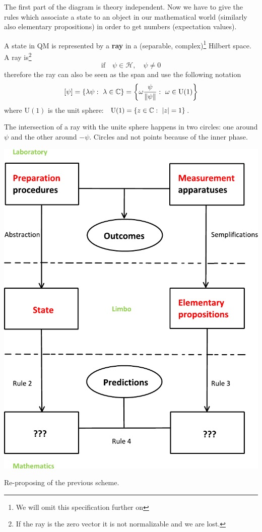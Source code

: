 \documentclass[../main.tex]{subfiles}
\begin{document}
The first part of the diagram  is theory independent. Now we have to give the rules which associate a state to an object in our mathematical world (similarly also elementary propositions) in order to get numbers (expectation values).
\begin{definition}
A state in QM is represented by a \textbf{ray} in a (separable, complex)\footnote{We will omit this specification further on} Hilbert space. A ray is\footnote{If the ray is the zero vector it is not normalizable and we are lost.}
\[
\textrm{if} \quad \psi \in \mathcal{H}, \quad \psi \neq 0
\]
therefore the ray can also be seen as the span and use the following notation
\[
\qty[\psi] = \left\{\lambda \psi : \ \lambda\in\mathbb{C}\right \} = \left\{\omega \frac{\psi}{\norm{\psi}} : \ \omega \in \textrm{U}(1)\right \}
\]
where $\textrm{U}(1)$ is the unit sphere: \ \( \textrm{U}(1) = \left\{z\in\mathbb{C} : \ \abs{z}=1\right\}\).
\end{definition}
\begin{kaobox}[frametitle=Remark]
The intersection of a ray with the unite sphere happens in two circles: one around $\psi$ and the other around $-\psi$. Circles and not points because of the inner phase.
\end{kaobox}
\begin{marginfigure}
	\includegraphics[width=1.1\linewidth]{images/Schema_Phys_theory.pdf}
	\caption[Schema Phys theory small]{Re-proposing of the previous scheme.}
\end{marginfigure}
\end{document}
